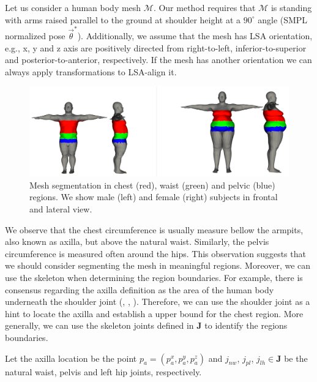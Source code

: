 \documentclass[runningheads, orivec]{llncs}
\begin{document}
Let us consider a human body mesh $\mathcal{M}$. Our method requires that 
$\mathcal{M}$ is standing with arms raised 
parallel to the 
ground at shoulder height at a $90^\circ$ angle (SMPL normalized pose
$\vec{\theta}^*$). Additionally, we assume that the mesh 
has LSA orientation, e.g., x, y and z axis are positively directed from 
right-to-left, inferior-to-superior and posterior-to-anterior, respectively. If 
the mesh has another orientation we can always apply transformations to 
LSA-align it.

\begin{figure}[t]
	\begin{center}
		\includegraphics[width=\linewidth]{subjects_2_6_calvis_segmented.png}
	\end{center}
	\caption{Mesh segmentation in chest (red), waist (green) and pelvic (blue) 
	regions. We show male (left) and female (right) subjects in frontal and 
	lateral view.}
	\label{fig:axilla-recognition}
\end{figure}

We observe that the chest circumference is usually measure bellow the armpits, 
also known as axilla, but above the natural waist. Similarly, the pelvis 
circumference is measured often around the hips. This observation suggests that 
we should consider segmenting the mesh in meaningful regions. Moreover, we can 
use the skeleton when determining the region boundaries. For 
example, there is consensus regarding the axilla 
definition as the area of the human body underneath the shoulder joint 
(\cite{MeSH.axilla}, \cite{FMA.axilla}, \cite{TA.axilla}). Therefore, we can 
use the shoulder joint as a hint to locate the axilla and establish a upper 
bound for the chest region. More generally, we can use the 
skeleton joints defined in $\mathbf{J}$ to identify the regions boundaries.

Let the axilla location be the point $p_a = (p^x_a, p^y_a, p^z_a)$ and 
$j_{nw}$, $j_{pl}$, 
$j_{lh} \in \mathbf{J}$ be the natural waist, pelvis and left hip joints, 
respectively.
\end{document}
